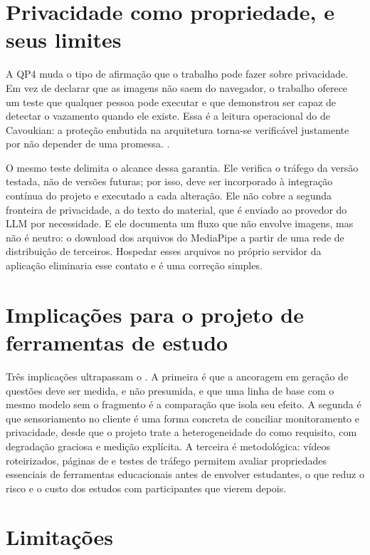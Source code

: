 \section{Privacidade como propriedade, e seus limites}

A QP4 muda o tipo de afirmação que o trabalho pode fazer sobre privacidade. Em vez de declarar que as imagens não saem do navegador, o trabalho oferece um teste que qualquer pessoa pode executar e que demonstrou ser capaz de detectar o vazamento quando ele existe. Essa é a leitura operacional do  de Cavoukian: a proteção embutida na arquitetura torna-se verificável justamente por não depender de uma promessa. .

O mesmo teste delimita o alcance dessa garantia. Ele verifica o tráfego da versão testada, não de versões futuras; por isso, deve ser incorporado à integração contínua do projeto e executado a cada alteração. Ele não cobre a segunda fronteira de privacidade, a do texto do material, que é enviado ao provedor do LLM por necessidade. E ele documenta um fluxo que não envolve imagens, mas não é neutro: o download dos arquivos do MediaPipe a partir de uma rede de distribuição de terceiros. Hospedar esses arquivos no próprio servidor da aplicação eliminaria esse contato e é uma correção simples.

\section{Implicações para o projeto de ferramentas de estudo}

Três implicações ultrapassam o \ferramenta. A primeira é que a ancoragem em geração de questões deve ser medida, e não presumida, e que uma linha de base com o mesmo modelo sem o fragmento é a comparação que isola seu efeito. A segunda é que sensoriamento no cliente é uma forma concreta de conciliar monitoramento e privacidade, desde que o projeto trate a heterogeneidade do  como requisito, com degradação graciosa e medição explícita. A terceira é metodológica: vídeos roteirizados, páginas de  e testes de tráfego permitem avaliar propriedades essenciais de ferramentas educacionais antes de envolver estudantes, o que reduz o risco e o custo dos estudos com participantes que vierem depois.

\section{\label{sec:limitacoes}Limitações}

